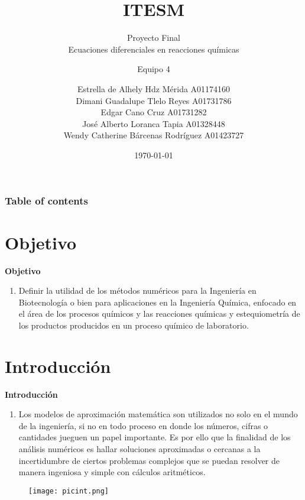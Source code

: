 \documentclass{beamer}
\begin{document}
\title{ITESM}  
\subtitle{Proyecto Final\\Ecuaciones diferenciales en reacciones químicas
}
\author{
	\author{Equipo 4}
		Estrella de Alhely Hdz Mérida A01174160\\
		Dimani Guadalupe Tlelo Reyes A01731786\\
		Edgar Cano Cruz A01731282\\
		José Alberto Loranca Tapia A01328448\\
		Wendy Catherine Bárcenas Rodríguez A01423727\\
}
\date{\today} 


\begin{frame}
\titlepage
\end{frame}

\begin{frame}\frametitle{Table of contents}
\tableofcontents
\end{frame} 


\section{Objetivo }

\begin{frame}
	\textbf{Objetivo}
	\begin{enumerate}
		\item
	    	Definir la utilidad de los métodos numéricos para la Ingeniería en Biotecnología o bien para aplicaciones en la Ingeniería Química, enfocado en el área de los procesos químicos y las reacciones químicas y estequiometría de los productos producidos en un proceso químico de laboratorio.
	\end{enumerate} 
\end{frame}


\section{Introducción }

\begin{frame}
	\textbf{Introducción}
	\begin{enumerate}
		\item
			Los modelos de aproximación matemática son utilizados no solo en el mundo de la ingeniería, si no en todo proceso en donde los números, cifras o cantidades jueguen un papel importante. Es por ello que la finalidad de los análisis numéricos es hallar soluciones aproximadas o cercanas a la incertidumbre de ciertos problemas complejos que se puedan resolver de manera ingeniosa y simple con cálculos aritméticos.
	\end{enumerate} 
	\begin{figure}[H]
		\centering
		\texttt{[image: picint.png]}
		\label{fig: Figura 1}
	\end{figure}
\end{frame}
\end{document}
